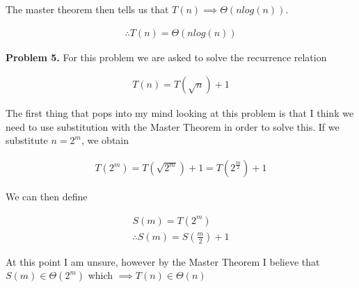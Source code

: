 \documentclass{article}
\begin{document}
The master theorem then tells us that $T(n) \implies \Theta(nlog(n))$.

\begin{gather}
    \therefore T(n) = \Theta(nlog(n))
\end{gather}

\textbf{Problem 5.} For this problem we are asked to solve the recurrence relation

\begin{gather}
    T(n) = T(\sqrt{n}) + 1
\end{gather}

The first thing that pops into my mind looking at this problem is that I think we need to use substitution with the Master Theorem in order to solve this. If we substitute $n = 2^m$, we obtain

\begin{gather}
    T(2^m) = T(\sqrt{2^m}) + 1 = T(2^{\frac{m}{2}}) + 1
\end{gather}

We can then define

\begin{gather}
    S(m) = T(2^m) \\
    \therefore S(m) = S(\frac{m}{2}) + 1
\end{gather}

At this point I am unsure, however by the Master Theorem I believe that $S(m) \in \Theta(2^m)$ which $\implies T(n) \in \Theta(n)$

\newpage
 

\end{document}
